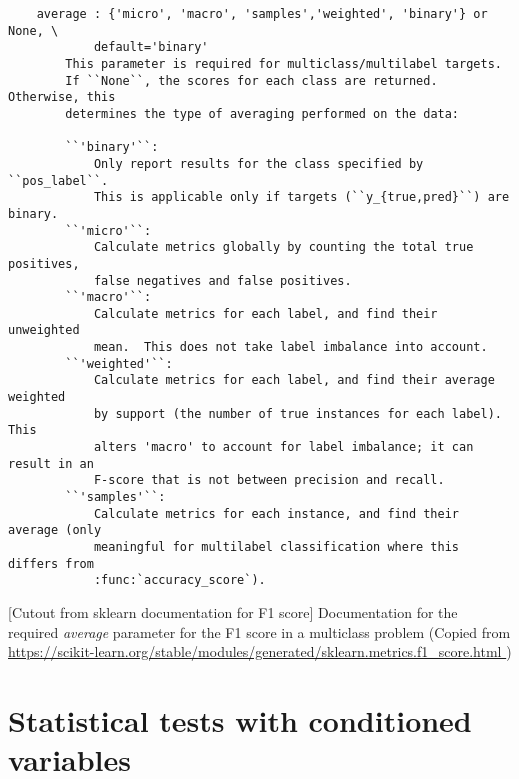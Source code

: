 \begin{center}
    \begin{verbatim}
    average : {'micro', 'macro', 'samples','weighted', 'binary'} or None, \
            default='binary'
        This parameter is required for multiclass/multilabel targets.
        If ``None``, the scores for each class are returned. Otherwise, this
        determines the type of averaging performed on the data:

        ``'binary'``:
            Only report results for the class specified by ``pos_label``.
            This is applicable only if targets (``y_{true,pred}``) are binary.
        ``'micro'``:
            Calculate metrics globally by counting the total true positives,
            false negatives and false positives.
        ``'macro'``:
            Calculate metrics for each label, and find their unweighted
            mean.  This does not take label imbalance into account.
        ``'weighted'``:
            Calculate metrics for each label, and find their average weighted
            by support (the number of true instances for each label). This
            alters 'macro' to account for label imbalance; it can result in an
            F-score that is not between precision and recall.
        ``'samples'``:
            Calculate metrics for each instance, and find their average (only
            meaningful for multilabel classification where this differs from
            :func:`accuracy_score`).
    \end{verbatim}
    [Cutout from sklearn documentation for F1 score]{
        Documentation for the required \textit{average} parameter for the F1 score in a multiclass problem
        (Copied from \url{https://scikit-learn.org/stable/modules/generated/sklearn.metrics.f1_score.html
        })}
    \label{fig:sklearn-f1-average-docs}
\end{center}


\section{Statistical tests with conditioned variables}\label{sec:statistical_tests_with_conditioned_variables}
